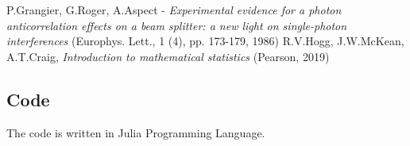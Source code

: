 \documentclass[10pt, final]{article}
\begin{document}
\begin{multicols}{2}
\hrulefill 

\begin{thebibliography}{99}
   P.Grangier, G.Roger, A.Aspect - \emph{Experimental evidence for a photon anticorrelation effects on a beam splitter: a new light on single-photon interferences} (Europhys. Lett., 1 (4), pp. 173-179, 1986)
   R.V.Hogg, J.W.McKean, A.T.Craig, \emph{Introduction to mathematical statistics} (Pearson, 2019)
\end{thebibliography}
\end{multicols}



\clearpage
\subsection*{Code}
The code is written in Julia Programming Language.
\end{document}
